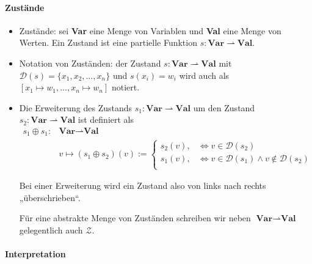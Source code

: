 \documentclass[
  a4paper,
  11pt,
]{scrartcl}
\newcommand{\Dc}{\mathcal{D}}
\newcommand{\Zc}{\mathcal{Z}}
\begin{document}
\paragraph{Zustände}
\label{par:zustande}

\begin{itemize}
  \item Zustände: sei \textbf{Var} eine Menge von Variablen und \textbf{Val}
    eine Menge von Werten. Ein Zustand ist eine partielle Funktion $s:
    \textbf{Var} \rightharpoonup \textbf{Val}$.

  \item Notation von Zuständen: der Zustand $s: \textbf{Var} \rightharpoonup
    \textbf{Val}$ mit $\Dc(s) = \{x_1, x_2, \dots, x_n\}$ und $s(x_i) =
    w_i$ wird auch als $[x_1 \mapsto w_1, \dots, x_n \mapsto w_n]$ notiert.

  \item Die Erweiterung des Zustands $s_1: \textbf{Var} \rightharpoonup
    \textbf{Val}$ um den Zustand $s_2: \textbf{Var} \rightharpoonup
    \textbf{Val}$ ist definiert als
    \begin{align*}
      s_1 \oplus s_1: & \textbf{Var} \rightharpoonup \textbf{Val}\\
      & v \mapsto (s_1 \oplus s_2)(v) :=
        \begin{cases}
          s_2(v), & \Leftrightarrow v \in \Dc(s_2)\\
          s_1(v), & \Leftrightarrow v \in \Dc(s_1)
            \wedge v \notin \Dc(s_2)\\
        \end{cases}
    \end{align*}

    Bei einer Erweiterung wird ein Zustand also von links nach rechts
    „überschrieben“.

    Für eine abstrakte Menge von Zuständen schreiben wir neben $\textbf{Var}
    \rightharpoonup \textbf{Val}$ gelegentlich auch $\Zc$.
\end{itemize}

\paragraph{Interpretation}
\label{par:interpretation}
\end{document}
